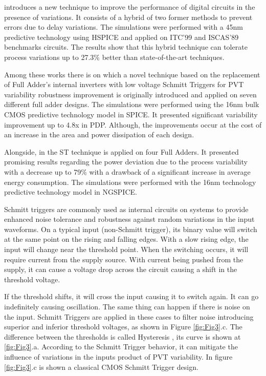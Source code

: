 \documentclass[ecp,tc, english]{iiufrgs}
\begin{document}
\cite{ahmadi2017hybrid} introduces a new technique to improve the performance of digital circuits in the presence of variations. It consists of a hybrid of two former methods to prevent errors due to delay variations. The simulations were performed with a 45nm predictive technology using HSPICE and applied on ITC’99 and ISCAS’89 benchmarks circuits. The results show that this hybrid technique can tolerate process variations up to 27.3\% better than state-of-the-art techniques.

Among these works there is \cite{dokania2015circuit} on which a novel technique based on the replacement of Full Adder’s internal inverters with low voltage Schmitt Triggers for PVT variability robustness improvement is originally introduced and applied on seven different full adder designs. The simulations were performed using the 16nm bulk CMOS predictive technology model in SPICE. It presented significant variability improvement up to 4.8x in PDP. Although, the improvements occur at the cost of an increase in the area and power dissipation of each design.  

Alongside, in \cite{samuel2016} the ST technique is applied on four Full Adders. It presented promising results regarding the power deviation due to the process variability with a decrease up to 79\% with a drawback of a significant increase in average energy consumption. The simulations were performed with the 16nm technology predictive technology model in NGSPICE. 

Schmitt triggers are commonly used as internal circuits on systems to provide enhanced noise tolerance and robustness against random variations in the input waveforms. On a typical input (non-Schmitt trigger), its binary value will switch at the same point on the rising and falling edges. With a slow rising edge, the input will change near the threshold point. When the switching occurs, it will require current from the supply source. With current being pushed from the supply, it can cause a voltage drop across the circuit causing a shift in the threshold voltage. 

If the threshold shifts, it will cross the input causing it to switch again. It can go indefinitely causing oscillation. The same thing can happen if there is noise on the input. Schmitt Triggers are applied in these cases to filter noise introducing superior and inferior threshold voltages, as shown in Figure \ref{fig:Fig3}.c. The difference between the thresholds is called Hysteresis \cite{WinNT}, its curve is shown at \ref{fig:Fig3}.a. According to the Schmitt Trigger behavior, it can mitigate the influence of variations in the inputs product of PVT variability. In figure \ref{fig:Fig3}.c is shown a classical CMOS Schmitt Trigger design. 
\end{document}
